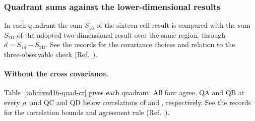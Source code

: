 \subsubsection{Quadrant sums against the lower-dimensional results}
\label{sec:fived16-quadrants}
In each quadrant the sum $S_{16}$ of the sixteen-cell result is compared with the sum $S_{\mathrm{2D}}$ of the adopted two-dimensional result over the same region, through $d=S_{16}-S_{\mathrm{2D}}$. See the records for the covariance choices and relation to the three-observable check (Ref.~\cite{NoteRecords2026}).

\paragraph{Without the cross covariance.} Table~\ref{tab:fived16-quad-cr} gives each quadrant. All four agree, QA and QB at every $\rho$, and QC and QD below correlations of  and , respectively. See the records for the correlation bounds and agreement rule (Ref.~\cite{NoteRecords2026}).

